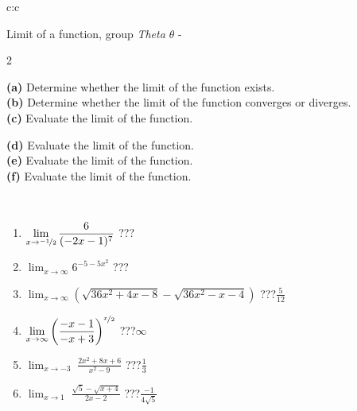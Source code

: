 \documentclass[10pt]{report}
\begin{document}
\newpage
\thispagestyle{empty}
\begin{tabular}{c:c}
\begin{minipage}[c][104.5mm][t]{0.5\linewidth}
\begin{center}
\vspace{5mm}
{\huge Limit of a function, group \textit{Theta $\theta$} -}\\[5mm]
\begin{minipage}{0.95\linewidth}
\begin{center}
{\small \begin{multicols}{2} \raggedright
\textbf{(a)} Determine whether the limit of the function exists. \\[1mm]
\textbf{(b)} Determine whether the limit of the function converges or diverges. \\[1mm]
\textbf{(c)} Evaluate the limit of the function. \par \columnbreak
\textbf{(d)} Evaluate the limit of the function. \\[1mm]
\textbf{(e)} Evaluate the limit of the function. \\[1mm]
\textbf{(f)} Evaluate the limit of the function. \\[1mm]
\end{multicols}
}
\end{center}
\end{minipage}
\\[1mm]
\begin{minipage}{0.79\linewidth}
\begin{center}
\begin{varwidth}{\linewidth}
\setlength{\itemsep}{0pt}
\begin{enumerate}
\normalsize
\item $\displaystyle\lim_{x\to\nicefrac{-1}{2}}{\frac{6}{(-2x-1)^{7}}}$\quad \dotfill\; ???\;\dotfill \quad {}
\item $\displaystyle\lim_{x\to\infty}{6^{-5-5x^2}}$\quad \dotfill\; ???\;\dotfill \quad {}
\item $\displaystyle\lim_{x\to\infty}{\left(\sqrt{36x^2+4x-8} - \sqrt{36x^2-x-4}\right)}$\quad \dotfill\; ???\;\dotfill \quad $\frac{5}{12}$
\item $\displaystyle\lim_{x\to\infty}{\left( \frac{-x-1}{-x+3} \right)^{\nicefrac{x}{2}}}$\quad \dotfill\; ???\;\dotfill \quad $\infty$
\item $\displaystyle\lim_{x\to -3}{\;\frac{2x^2+8x+6}{x^2-9}}$\quad \dotfill\; ???\;\dotfill \quad $\frac{1}{3}$
\item $\displaystyle\lim_{x\to 1}{\;\frac{\sqrt{5}-\sqrt{x+4}}{2x-2}}$\quad \dotfill\; ???\;\dotfill \quad $\frac{-1}{4\sqrt{5}}$

\end{enumerate}
\end{varwidth}
\end{center}
\end{minipage}
\end{center}
\end{minipage}
\end{tabular}
\end{document}
